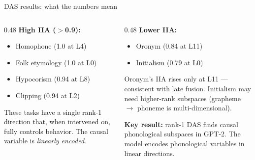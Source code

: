 \documentclass[10pt,aspectratio=169]{beamer}
\begin{document}
\begin{frame}{DAS results: what the numbers mean}

\begin{columns}[T]
\begin{column}{0.48\textwidth}
\textbf{High IIA ($>$0.9):}
\begin{itemize}
  \item Homophone (1.0 at L4)
  \item Folk etymology (1.0 at L0)
  \item Hypocorism (0.94 at L8)
  \item Clipping (0.94 at L2)
\end{itemize}

\vspace{0.3em}
These tasks have a single rank-1 direction that, when intervened on, fully controls behavior. The causal variable is \emph{linearly encoded}.
\end{column}

\begin{column}{0.48\textwidth}
\textbf{Lower IIA:}
\begin{itemize}
  \item Oronym (0.84 at L11)
  \item Initialism (0.79 at L0)
\end{itemize}

\vspace{0.3em}
Oronym's IIA rises only at L11 --- consistent with late fusion. Initialism may need higher-rank subspaces (grapheme $\to$ phoneme is multi-dimensional).

\vspace{0.3em}
\textbf{Key result:} rank-1 DAS finds causal phonological subspaces in GPT-2. The model encodes phonological variables in linear directions.
\end{column}
\end{columns}
\end{frame}

\begin{frame}
\begin{center}
\vfill
  {\setlength{\fboxrule}{2.5pt}}
\vfill
\end{center}
\end{frame}
\end{document}
